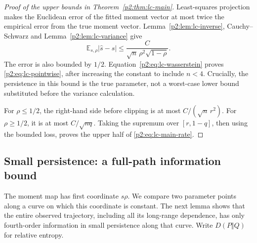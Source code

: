 \documentclass[11pt,a4paper]{article}
\theoremstyle{definition}
\theoremstyle{remark}
\numberwithin{equation}{section}
\begin{document}
\begin{proof}[Proof of the upper bounds in Theorem~\ref{p2:thm:lc-main}]
Least-squares projection makes the Euclidean error of the fitted moment
vector at most twice the empirical error from the true moment vector.
Lemma~\ref{p2:lem:lc-inverse}, Cauchy--Schwarz and
Lemma~\ref{p2:lem:lc-variance} give
\[
 \mathbb E_{s,\rho}|\widehat s-s|
     \le\frac C{\sqrt n\,\rho^2\sqrt{1-\rho}}.
\]
The error is also bounded by $1/2$.  Equation~\eqref{p2:eq:lc-wasserstein}
proves \eqref{p2:eq:lc-pointwise}, after increasing the constant to include
$n<4$.  Crucially, the persistence in this bound is the true parameter,
not a worst-case lower bound substituted before the variance calculation.

For $\rho\le1/2$, the right-hand side before clipping is at most
$C/(\sqrt n\,r^2)$.  For $\rho\ge1/2$, it is at most
$C/\sqrt{nq}$.  Taking the supremum over $[r,1-q]$, then using the bounded
loss, proves the upper half of \eqref{p2:eq:lc-main-rate}.
\end{proof}

\subsection{Small persistence: a full-path information bound}

The moment map has first coordinate $s\rho$.  We compare two parameter
points along a curve on which this coordinate is constant.  The next lemma
shows that the entire observed trajectory, including all its long-range
dependence, has only fourth-order information in small persistence along
that curve.  Write $D(P\Vert Q)$ for relative entropy.
\end{document}
